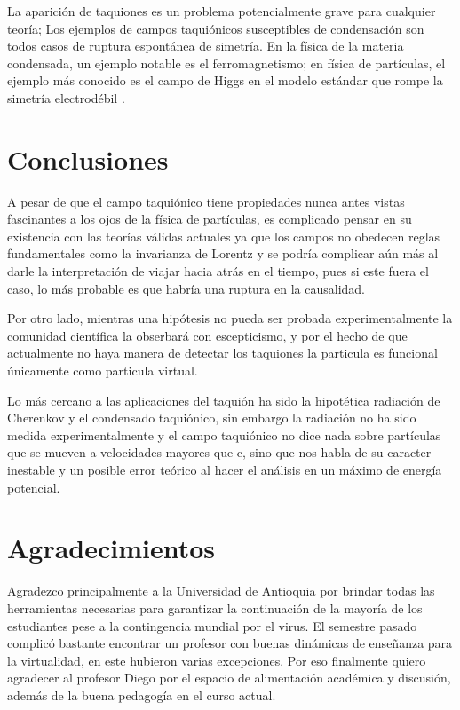 \documentclass[twocolumn,preprintnumbers,amsmath,amssymb]{revtex4}
\begin{document}
La aparición de taquiones es un problema potencialmente grave para cualquier teoría; Los ejemplos de campos taquiónicos susceptibles de condensación son todos casos de ruptura espontánea de simetría. En la física de la materia condensada, un ejemplo notable es el ferromagnetismo; en física de partículas, el ejemplo más conocido es el campo de Higgs en el modelo estándar que rompe la simetría electrodébil \cite{kostelecky1988static}.   


\section{Conclusiones}
A pesar de que el campo taquiónico tiene propiedades nunca antes vistas fascinantes a los ojos de la física de partículas, es complicado pensar en su existencia con las teorías válidas actuales ya que los campos no obedecen reglas fundamentales como la invarianza de Lorentz y se podría complicar aún más al darle la interpretación de viajar hacia atrás en el tiempo, pues si este fuera el caso, lo más probable es que habría una ruptura en la causalidad.  

Por otro lado, mientras una hipótesis no pueda ser probada experimentalmente la comunidad científica la obserbará con escepticismo, y por el hecho de que actualmente no haya manera de detectar los taquiones la particula es funcional únicamente como particula virtual.   

Lo más cercano a las aplicaciones del taquión ha sido la hipotética radiación de Cherenkov y el condensado taquiónico, sin embargo la radiación no ha sido medida experimentalmente y el campo taquiónico no dice nada sobre partículas que se mueven a velocidades mayores que c, sino que nos habla de su caracter inestable y un posible error teórico al hacer el análisis en un máximo de energía potencial.   



\section{Agradecimientos}

Agradezco principalmente a la Universidad de Antioquia por brindar todas las herramientas necesarias para garantizar la continuación de la mayoría de los estudiantes pese a la contingencia mundial por el virus.
El semestre pasado complicó bastante encontrar un profesor con buenas dinámicas de enseñanza para la virtualidad, en este hubieron varias excepciones. Por eso finalmente quiero agradecer al profesor Diego por el espacio de alimentación académica y discusión, además de la buena pedagogía en el curso actual.


\end{document}
